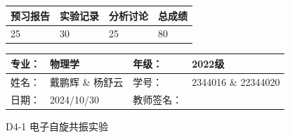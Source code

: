 \documentclass[dvipsnames, svgnames,a4paper,11pt]{article}
\begin{document}
\begin{table}
	\renewcommand\arraystretch{1.7}
	\begin{tabularx}{\textwidth}{
		|X|X|X|X
		|X|X|X|X|}
	\hline
	\multicolumn{2}{|c|}{预习报告}&\multicolumn{2}{|c|}{实验记录}&\multicolumn{2}{|c|}{分析讨论}&\multicolumn{2}{|c|}{总成绩}\\
	\hline
	\LARGE25 & & \LARGE30 & & \LARGE25 & & \LARGE80 & \\
	\hline
	\end{tabularx}
\end{table}


\begin{table}
	\renewcommand\arraystretch{1.7}
	\begin{tabularx}{\textwidth}{|X|X|X|X|}
	\hline
	专业：& 物理学 &年级：& 2022级\\
	\hline
	姓名：& 戴鹏辉 \& 杨舒云  & 学号： & 2344016 \& 22344020 \\
	\hline
	日期：& 2024/10/30 & 教师签名：& \\
	\hline
	\end{tabularx}
\end{table}

\begin{center}
	\LARGE D4-1 \quad 电子自旋共振实验
\end{center}
\end{document}
